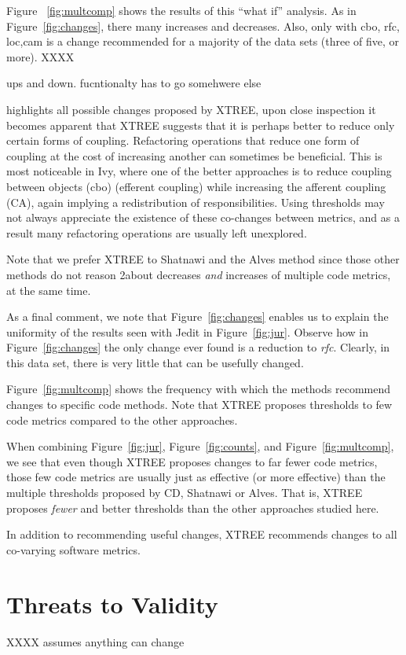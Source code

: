 \documentclass[twocolumn,5p]{elsarticle}
\newcommand{\fig}[1]{Figure~\ref{fig:#1}}
\theoremstyle{break}
\begin{document}
\begin{itemize}
{Figure ~\ref{fig:multcomp} shows the results of this ``what if'' analysis. As in  \fig{changes}, there many increases
and decreases. Also, only with  cbo, rfc, loc,cam is a change recommended for a majority of the
data sets  (three of five, or more). 
XXXX

ups and down. fucntionalty has to go somehwere else


highlights all possible changes proposed by XTREE, upon close inspection it becomes apparent that XTREE suggests that it is perhaps better to reduce only certain forms of coupling. Refactoring operations that reduce one form of coupling at the cost of increasing another can sometimes be beneficial. This is most noticeable in Ivy, where one of the better approaches is to reduce coupling between objects (cbo) (efferent coupling) while increasing the afferent coupling (CA), again implying a redistribution of responsibilities. Using thresholds may not always appreciate the existence of these co-changes between metrics, and as a result many refactoring operations are usually left unexplored.

Note that we prefer XTREE to Shatnawi and the Alves
method since those other methods
do not reason
2about decreases {\em and} increases of multiple 
code metrics, at the same time.

As a final comment, we note
that  \fig{changes} enables us to explain the uniformity
of the results seen with Jedit in \fig{jur}.
Observe how in \fig{changes} the only change ever
found is a reduction to {\em rfc}. Clearly, in this
data set, there is very little that can be usefully changed.


\fig{multcomp} shows the frequency with which the methods
recommend changes to specific code methods.
Note that XTREE proposes thresholds to
few code metrics compared to the other approaches. 

When combining  \fig{jur}, \fig{counts}, and \fig{multcomp}, we   see that
even though XTREE proposes changes to far fewer code metrics, those few
code metrics are usually just as effective (or
more effective) than the multiple
thresholds
proposed by CD, Shatnawi or Alves.  That is, XTREE proposes
{\em fewer} and better thresholds than the other approaches studied here.

\begin{lesson}
In addition to recommending useful changes, XTREE recommends changes to all co-varying software metrics.
\end{lesson}


\section{Threats to Validity}\label{sect:valid}
XXXX assumes anything can change

}
\end{itemize}
\end{document}
